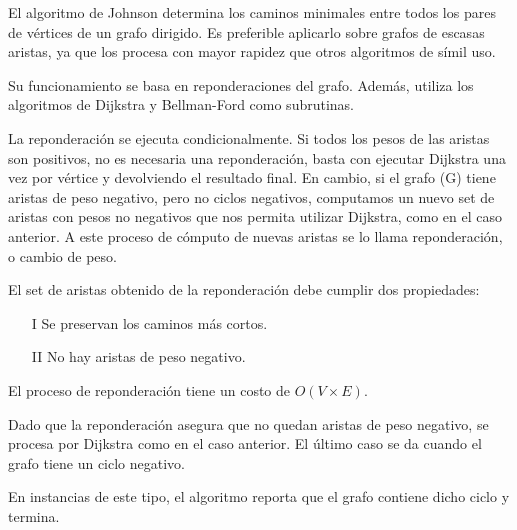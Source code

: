 \documentclass[../tp2_grupo404.tex]{subfiles}
\begin{document}
El algoritmo de Johnson determina los caminos minimales entre todos
los pares de vértices de un grafo dirigido. Es preferible aplicarlo
sobre grafos de escasas aristas, ya que los procesa con mayor
rapidez que otros algoritmos de símil uso.

Su funcionamiento se basa en reponderaciones del grafo. Además,
utiliza los algoritmos de Dijkstra y Bellman-Ford como subrutinas.

La reponderación se ejecuta condicionalmente. Si todos los pesos
de las aristas son positivos, no es necesaria una reponderación,
basta con ejecutar Dijkstra una vez por vértice y devolviendo el
resultado final. En cambio, si el grafo (G) tiene aristas de peso
negativo, pero no ciclos negativos, computamos un nuevo set de
aristas con pesos no negativos que nos permita utilizar Dijkstra,
como en el caso anterior. A este proceso de cómputo de nuevas
aristas se lo llama reponderación, o cambio de peso.

El set de aristas obtenido de la reponderación debe cumplir dos
propiedades:
\begin{enumerate}
    \item[I] Se preservan los caminos más cortos.
    \item[II] No hay aristas de peso negativo.
\end{enumerate}

El proceso de reponderación tiene un costo de $O(V\times E)$.

Dado que la reponderación asegura que no quedan aristas de peso
negativo, se procesa por Dijkstra como en el caso anterior.
El último caso se da cuando el grafo tiene un ciclo negativo.

En instancias de este tipo, el algoritmo reporta que el grafo
contiene dicho ciclo y termina.

\end{document}

